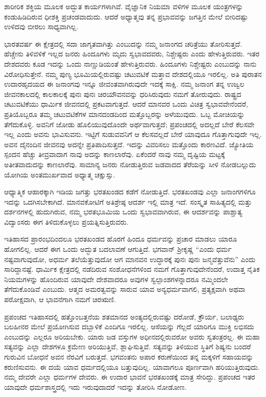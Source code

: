ಶಾರೀರಿಕ ಶಕ್ತಿಯ ಮೂಲಕ ಅದ್ಭುತ ಕಾರ್ಯಗಳಾಗಿವೆ. ವೈಜ್ಞಾನಿಕ ನಿಯಮಾ ವಳಿಗಳ ಮೂಲಕ ಯಂತ್ರಗಳನ್ನು ಕಂಡುಹಿಡಿದಿರುವ ಧೀಶಕ್ತಿ ಪ್ರಚಂಡವಾದುದು. ಆದರೆ ಅಧ್ಯಾತ್ಮವು ತನ್ನ ಪ್ರಭಾವವನ್ನು ಜಗತ್ತಿನ ಮೇಲೆ ಬೀರಿದಷ್ಟು ಉಳಿದವು ಬೀರಲು ಸಾಧ್ಯವಾಗಿಲ್ಲ.

ಭಾರತವರ್ಷ ಈ ಕ್ಷೇತ್ರದಲ್ಲಿ ಸದಾ ಜಾಗೃತವಾಗಿತ್ತು ಎಂಬುದನ್ನು ನಮ್ಮ ಜನಾಂಗದ ಚರಿತ್ರೆಯು ತೋರಿಸುತ್ತದೆ. ಹೆಚ್ಚೇನು ತಿಳಿವಳಿಕೆ ಇಲ್ಲದ ಜನರು ಹಿಂದೂಗಳು ಮೃದು ಸ್ವಭಾವದವರು, ನಿಶ್ಚೇಷ್ಟರು ಎಂದು ಹೇಳುತ್ತಿರುವರು. ಇತರ ದೇಶದವರು ಕೂಡ ಇದನ್ನು ಒಂದು ನಾಣ್ಣುಡಿಯಂತೆ ಹೇಳುತ್ತಿರುವರು. ಹಿಂದೂಗಳು ನಿಶ್ಚೇಷ್ಟರು ಎಂಬುದನ್ನು ನಾನು ವಿರೋಧಿಸುತ್ತೇನೆ. ನಮ್ಮ ಪುಣ್ಯ ಭೂಮಿಯಲ್ಲಿರುವಷ್ಟು ಚಟುವಟಿಕೆ ಮತ್ತಾವ ದೇಶದಲ್ಲಿಯೂ ಇರಲಿಲ್ಲ. ಅತಿ ಪುರಾತನ ಉದಾರಹೃದಯದ ಈ ಜನಾಂಗವು ಇನ್ನೂ ಜೀವಂತವಾಗಿರುವುದೇ ಇದಕ್ಕೆ ಸಾಕ್ಷಿ. ನಮ್ಮ ಜನಾಂಗ ತನ್ನ ಉಜ್ವಲ ಜೀವನಕಾಲದಲ್ಲಿ ಕಾಲಕಾಲಕ್ಕೆ ಪುನಃ ಪುನಃ ಚಿರಯೌವನವನ್ನು ಧರಿಸಿರುವುದು ನಮಗೆ ತೋರುವುದು. ರಾಷ್ಟ್ರದ ಚಟುವಟಿಕೆಯು ಧಾರ್ಮಿಕ ಜೀವನದಲ್ಲಿ ಪ್ರಕಟವಾಗುತ್ತದೆ. ಆದರೆ ಮಾನವರ ಒಂದು ವಿಚಿತ್ರ ಸ್ವಭಾವವೇನೆಂದರೆ, ಪ್ರತಿಯೊಬ್ಬರೂ ತಮ್ಮ ಚಟುವಟಿಕೆಗಳ ಮಾನದಂಡದಿಂದ ಮತ್ತೊಬ್ಬರನ್ನು ಅಳೆಯುವುದು. ಒಬ್ಬ ಮೋಚಿಯನ್ನು ತೆಗೆದುಕೊಳ್ಳಿ. ಅವನಿಗೆ ಜೋಡು ಹೊಲಿಯುವುದೊಂದೇ ಅರ್ಥವಾಗುತ್ತದೆ; ಪ್ರಪಂಚದಲ್ಲಿ ಅದಲ್ಲದೆ ಬೇರೆ ಕೆಲಸವೇ ಇಲ್ಲ ಎಂದು ಅವನು ಭಾವಿಸುವನು. ಇಟ್ಟಿಗೆ ಸುಡುವವನಿಗೆ ಆ ಕೆಲಸವಲ್ಲದೆ ಬೇರೆ ಯಾವುದೂ ಗೊತ್ತಾಗುವುದೇ ಇಲ್ಲ. ಅವನ ದೈನಂದಿನ ಜೀವನವು ಅದನ್ನೇ ಪ್ರತಿಪಾದಿಸುತ್ತದೆ. ಇದನ್ನು ವಿವರಿಸಲು ಮತ್ತೊಂದು ಕಾರಣವಿದೆ. ಜ್ಯೋತಿಯ ಸ್ಪಂದನ ಹೆಚ್ಚು ತೀವ್ರವಾದಾಗ ನಾವು ಅದನ್ನು ಕಾಣಲಾರೆವು. ಏಕೆಂದರೆ ನಾವು ನಮ್ಮ ದೃಷ್ಟಿಯ ಮಟ್ಟಕ್ಕೆ ಅತೀತವಾದುದನ್ನು ಕಾಣಲಾರೆವು. ಸಾಮಾನ್ಯ ಜನರು ನೋಡುತ್ತಿರುವ ಜಡವಾದದ ತೆರೆಯನ್ನು ಸೀಳಿ ನೋಡಬಲ್ಲುದು ಯೋಗಿಯ ಅಂತಮುರ್ಖವಾದ ಅಧ್ಯಾತ್ಮ ಚಕ್ಷುಸ್ಸು.

ಆಧ್ಯಾತ್ಮಿಕ ಆಹಾರಕ್ಕಾಗಿ ಇಡಿಯ ಜಗತ್ತು ಭರತಖಂಡದ ಕಡೆಗೆ ನೋಡುತ್ತಿದೆ. ಭರತಖಂಡವು ಎಲ್ಲಾ ಜನಾಂಗಗಳಿಗೂ ಇದನ್ನು ಒದಗಿಸಬೇಕಾಗಿದೆ. ಮಾನವಕೋಟಿಗೆ ಅತಿಶ್ರೇಷ್ಠ ಆದರ್ಶ ಇಲ್ಲಿ ಮಾತ್ರ ಇದೆ. ಸಂಸ್ಕೃತ ಸಾಹಿತ್ಯದಲ್ಲಿ ಮತ್ತು ದರ್ಶನಗಳಲ್ಲಿ ಹುದುಗಿರುವ, ನಮ್ಮ ಭರತಭೂಮಿಯ ಒಂದು ಸ್ವಭಾವವಾಗಿರುವ, ಈ ಆದರ್ಶವನ್ನು ಪಾಶ್ಚಾತ್ಯ ವಿದ್ವಾಂಸರು ಈಗ ತಿಳಿದುಕೊಳ್ಳಲು ಪ್ರಯತ್ನಿಸುತ್ತಿರುವರು.

ಇತಿಹಾಸದ ಪ್ರಾರಂಭದಿಂದಲೂ ಭರತಖಂಡದ ಹೊರಗೆ ಹಿಂದೂ ಧರ್ಮವನ್ನು ಪ್ರಚಾರ ಮಾಡಲು ಯಾರೂ ಹೋಗಲಿಲ್ಲ. ಆದರೆ ಈಗ ಒಂದು ಅದ್ಭುತ ಬದಲಾವಣೆ ಆಗುತ್ತಿದೆ. ಭಗವಾನ್​ ಶ‍್ರೀಕೃಷ್ಣ “ಎಂದು ಧರ್ಮ ನಷ್ಟವಾಗುವುದೋ, ಅಧರ್ಮ ತಲೆಯೆತ್ತುವುದೋ ಆಗ ಮಾನವನ ಉದ್ಧಾರಕ್ಕೆ ಪುನಃ ಪುನಃ ಜನ್ಮವೆತ್ತುವೆನು” ಎಂದು ಸಾರಿದ್ದಾನಷ್ಟೆ. ಧಾರ್ಮಿಕ ಕ್ಷೇತ್ರದಲ್ಲಿ ನಡೆದಿರುವ ಸಂಶೋಧನೆಗಳಿಂದ ನಮಗೆ ಗೊತ್ತಾಗುವುದೇನೆಂದರೆ, ಉದಾತ್ತ ನೈತಿಕ ನಿಯಮಗಳನ್ನು ಹೊಂದಿರುವ ಯಾವುದೇ ದೇಶವಾದರೂ ಅವುಗಳ ಸ್ವಲ್ಪಾಂಶಗಳನ್ನಾದರೂ ನಮ್ಮಿಂದಲೇ ತೆಗೆದುಕೊಂಡಿವೆ ಎಂಬುದು. ಆತ್ಮದ ಅಮರತ್ವವನ್ನು ಸಾರುವ ಯಾವ ಅನ್ಯಧರ್ಮವಾಗಲಿ, ಪ್ರತ್ಯಕ್ಷವಾಗಿ ಅಥವಾ ಪರೋಕ್ಷವಾಗಿ, ಆ ಭಾವನೆಗಾಗಿ ನಮಗೆ ಚಿರಋಣಿ.

ಪ್ರಪಂಚದ ಇತಿಹಾಸದಲ್ಲಿ ಹತ್ತೊಂಬತ್ತನೆಯ ಶತಮಾನದ ಅಂತ್ಯದಲ್ಲಿರುವಷ್ಟು ದರೋಡೆ, ಕ್ರೌರ್ಯ, ಬಲಾಢ್ಯರು ಬಲಹೀನರ ಮೇಲೆ ಪ್ರಯೋಗಿಸುವ ದಬ್ಬಾಳಿಕೆ ಎಂದಿಗೂ ಇರಲಿಲ್ಲ. ಆಸೆಯನ್ನು ಗೆಲ್ಲದೆ ಯಾರಿಗೂ ಮುಕ್ತಿ ಲಭಿಸದು ಎಂಬುದನ್ನು ಎಲ್ಲರೂ ಅರಿಯಬೇಕು. ಯಾರು ಜಡ ವಸ್ತುಗಳ ಅಧೀನದಲ್ಲಿರುವರೋ ಅವರು ಸ್ವತಂತ್ರರಲ್ಲ. ಈ ಮಹಾ ಸತ್ಯವನ್ನು ಎಲ್ಲಾ ದೇಶಗಳೂ ಕ್ರಮೇಣ ಅರಿಯುತ್ತಿವೆ, ಶ್ಲಾಘಿಸುತ್ತಿವೆ. ಸತ್ಯವನ್ನು ತಿಳಿಯುವ ಸ್ಥಿತಿಗೆ ಶಿಷ್ಯನು ಬಂದರೆ ಗುರುವಿನ ಬೋಧನೆ ಅವನ ನೆರವಿಗೆ ಬರುತ್ತದೆ. ಭಗವಂತನು ಅಪಾರ ಕರುಣೆಯಿಂದ ತನ್ನ ಮಕ್ಕಳಿಗೆ ಸಹಾಯವನ್ನು ಕರುಣಿಸುವನು. ಈ ದಯೆ ಯಾವ ಧರ್ಮದಲ್ಲಿಯೂ ಬತ್ತುವುದಿಲ್ಲ. ಯಾವಾಗಲೂ ಪೂರ್ಣವಾಗಿ ಹರಿಯುತ್ತಿರುವುದು. ನಮ್ಮ ದೇವರೇ ಎಲ್ಲಾ ಧರ್ಮಗಳ ದೇವರು. ಈ ಉದಾರ ಭಾವನೆ ಭರತಖಂಡಕ್ಕೆ ಮಾತ್ರ ಸೇರಿದ್ದು. ಪ್ರಪಂಚದ ಇತರ ಯಾವುದೇ ಧರ್ಮಶಾಸ್ತ್ರದಲ್ಲಿ ಇದು ಇರುವುದಾದರೆ ಇದನ್ನು ತೋರಿಸಿ ನೋಡೋಣ.


